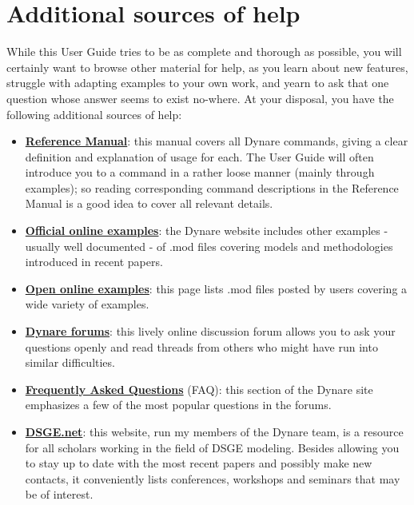 \section{Additional sources of help}
While this User Guide tries to be as complete and thorough as possible, you will certainly want to browse other material for help, as you learn about new features, struggle with adapting examples to your own work, and yearn to ask that one question whose answer seems to exist no-where. At your disposal, you have the following additional sources of help:
\begin{itemize}
\item \href{http://www.cepremap.cnrs.fr/juillard/mambo/download/manual/index.html}{\textbf{Reference Manual}}: this manual covers all Dynare commands, giving a clear definition and explanation of usage for each. The User Guide will often introduce you to a command in a rather loose manner (mainly through examples); so reading corresponding command descriptions in the Reference Manual is a good idea to cover all relevant details. 
\item \href{http://www.cepremap.cnrs.fr/juillard/mambo/index.php?option=com_content&task=category&sectionid=11&id=96&Itemid=89}{\textbf{Official online examples}}: the Dynare website includes other examples - usually well documented - of .mod files covering models and methodologies introduced in recent papers. 
\item \href{http://www.cepremap.cnrs.fr/juillard/mambo/index.php?option=com_forum&Itemid=95&page=viewforum&f=2&sid=10290a11eb7a48243971159f5b86f83e}{\textbf{Open online examples}}: this page lists .mod files posted by users covering a wide variety of examples. 
\item \href{http://www.cepremap.cnrs.fr/juillard/mambo/index.php?option=com_forum&Itemid=95&page=viewforum&f=1}{\textbf{Dynare forums}}: this lively online discussion forum allows you to ask your questions openly and read threads from others who might have run into similar difficulties. 
\item \href{http://www.cepremap.cnrs.fr/juillard/mambo/index.php?option=com_content&task=section&id=3&Itemid=40}{\textbf{Frequently Asked Questions}} (FAQ): this section of the Dynare site emphasizes a few of the most popular questions in the forums. 
\item \href{http://www.dsge.net}{\textbf{DSGE.net}}: this website, run my members of the Dynare team, is a resource for all scholars working in the field of DSGE modeling. Besides allowing you to stay up to date with the most recent papers and possibly make new contacts, it conveniently lists conferences, workshops and seminars that may be of interest. 
\end{itemize}

